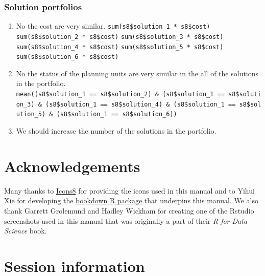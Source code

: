 \documentclass[12pt,]{book}
\providecommand{\tightlist}{%
  \setlength{\itemsep}{0pt}\setlength{\parskip}{0pt}}
\let\BeginKnitrBlock\begin \let\EndKnitrBlock\end
\begin{document}
\clearpage

\subsection{Solution portfolios}\label{solution-portfolios-1}

\BeginKnitrBlock{rmdanswer}
\begin{enumerate}
\def\labelenumi{\arabic{enumi}.}
\tightlist
\item
  No the cost are very similar. \newline
   \texttt{sum(s8\$solution\_1\ *\ s8\$cost)} \newline
   \texttt{sum(s8\$solution\_2\ *\ s8\$cost)} \newline
   \texttt{sum(s8\$solution\_3\ *\ s8\$cost)} \newline
   \texttt{sum(s8\$solution\_4\ *\ s8\$cost)} \newline
   \texttt{sum(s8\$solution\_5\ *\ s8\$cost)} \newline
   \texttt{sum(s8\$solution\_6\ *\ s8\$cost)}
\item
  No the status of the planning units are very similar in the all of the
  solutions in the portfolio. \newline
  \texttt{mean((s8\$solution\_1\ ==\ s8\$solution\_2)\ \&\ (s8\$solution\_1\ ==\ s8\$solution\_3)\ \&\ (s8\$solution\_1\ ==\ s8\$solution\_4)\ \&\ (s8\$solution\_1\ ==\ s8\$solution\_5)\ \&\ (s8\$solution\_1\ ==\ s8\$solution\_6))}
\item
  We should increase the number of the solutions in the portfolio.
\end{enumerate}
\EndKnitrBlock{rmdanswer}

\chapter{Acknowledgements}\label{acknowledgements}

Many thanks to \href{https://icons8.com}{Icons8} for providing the icons
used in this manual and to Yihui Xie for developing the
\href{http://bookdown.org}{bookdown R package} that underpins this
manual. We also thank Garrett Grolemund and Hadley Wickham for creating
one of the Rstudio screenshots used in this manual that was originally a
part of their \emph{R for Data Science} book.

\chapter{Session information}\label{session-information}
\end{document}
